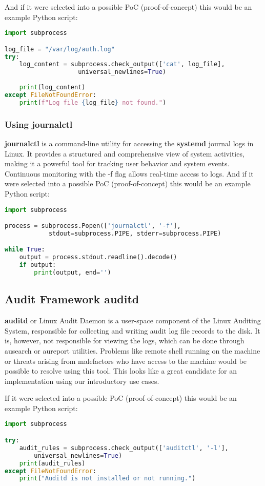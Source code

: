 \documentclass{VUMIFPSmagistrinis}
\begin{document}
\noindent And if it were selected into a possible PoC (proof-of-concept) this would be an example Python script:
\begin{lstlisting}[language=Python]
import subprocess

log_file = "/var/log/auth.log"
try:
    log_content = subprocess.check_output(['cat', log_file], 
                    universal_newlines=True)
    
    print(log_content)
except FileNotFoundError:
    print(f"Log file {log_file} not found.")
\end{lstlisting}

\subsubsection{Using journalctl}
\textbf{journalctl} is a command-line utility for accessing the \textbf{systemd} journal logs in Linux. It provides a structured and comprehensive view of system activities, making it a powerful tool for tracking user behavior and system events. Continuous monitoring with the -f flag allows real-time access to logs. And if it were selected into a possible PoC (proof-of-concept) this would be an example Python script:
\begin{lstlisting}[language=Python]
import subprocess

process = subprocess.Popen(['journalctl', '-f'], 
            stdout=subprocess.PIPE, stderr=subprocess.PIPE)

while True:
    output = process.stdout.readline().decode()
    if output:
        print(output, end='')
\end{lstlisting}

\subsection{Audit Framework auditd}
\textbf{auditd} or Linux Audit Daemon is a user-space component of the Linux Auditing System, responsible for collecting and writing audit log file records to the disk. It is, however, not responsible for viewing the logs, which can be done through ausearch or aureport utilities. Problems like remote shell running on the machine or threats arising from malefactors who have access to the machine would be possible to resolve using this tool. This looks like a great candidate for an implementation using our introductory use cases.

If it were selected into a possible PoC (proof-of-concept) this would be an example Python script:
\begin{lstlisting}[language=Python]
import subprocess

try:
    audit_rules = subprocess.check_output(['auditctl', '-l'], 
        universal_newlines=True)
    print(audit_rules)
except FileNotFoundError:
    print("Auditd is not installed or not running.")
\end{lstlisting}
\end{document}
